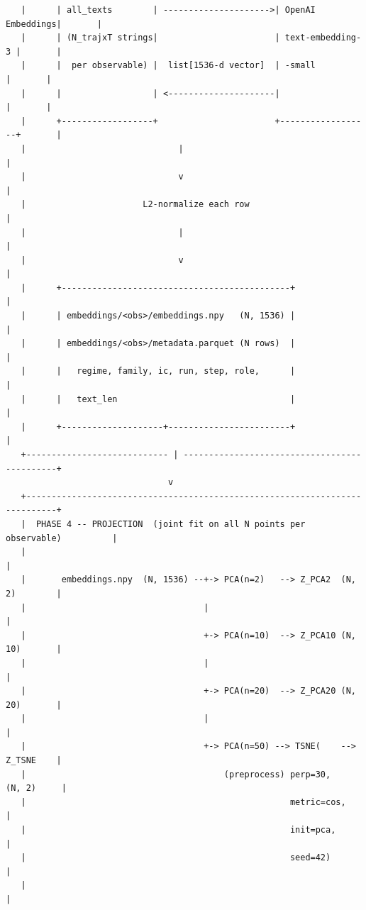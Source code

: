 \documentclass{article}
\theoremstyle{plain}
\theoremstyle{definition}
\begin{document}
\begin{verbatim}
   |      | all_texts        | --------------------->| OpenAI Embeddings|       |
   |      | (N_trajxT strings|                       | text-embedding-3 |       |
   |      |  per observable) |  list[1536-d vector]  | -small           |       |
   |      |                  | <---------------------|                  |       |
   |      +------------------+                       +------------------+       |
   |                              |                                             |
   |                              v                                             |
   |                       L2-normalize each row                                |
   |                              |                                             |
   |                              v                                             |
   |      +---------------------------------------------+                       |
   |      | embeddings/<obs>/embeddings.npy   (N, 1536) |                       |
   |      | embeddings/<obs>/metadata.parquet (N rows)  |                       |
   |      |   regime, family, ic, run, step, role,      |                       |
   |      |   text_len                                  |                       |
   |      +--------------------+------------------------+                       |
   +---------------------------- | ---------------------------------------------+
                                v
   +----------------------------------------------------------------------------+
   |  PHASE 4 -- PROJECTION  (joint fit on all N points per observable)          |
   |                                                                            |
   |       embeddings.npy  (N, 1536) --+-> PCA(n=2)   --> Z_PCA2  (N, 2)        |
   |                                   |                                        |
   |                                   +-> PCA(n=10)  --> Z_PCA10 (N, 10)       |
   |                                   |                                        |
   |                                   +-> PCA(n=20)  --> Z_PCA20 (N, 20)       |
   |                                   |                                        |
   |                                   +-> PCA(n=50) --> TSNE(    --> Z_TSNE    |
   |                                       (preprocess) perp=30,     (N, 2)     |
   |                                                    metric=cos,             |
   |                                                    init=pca,               |
   |                                                    seed=42)                |
   |                                                                            |

\end{verbatim}
\end{document}
